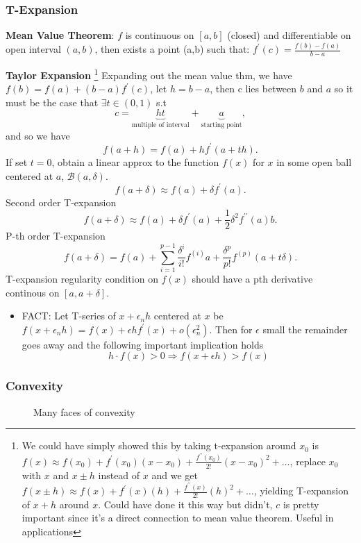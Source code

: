 \documentclass[11pt]{article}
\theoremstyle{quest}
\begin{document}
\subsubsection{T-Expansion}
\begin{flushleft}\textbf{Mean Value Theorem}: $f$ is continuous on $[a,b]$ (closed) and differentiable on open interval $(a,b)$, then exists a point (a,b) such that: $f^{'}(c) = \frac{f(b)-f(a)}{b-a}$\end{flushleft}
%
\textbf{Taylor Expansion}%
%
\footnote{We could have simply showed this by taking t-expansion around $x_0$ is $f(x)\approx f(x_0)+f^\prime(x_0)(x-x_0)+\frac{f^{\prime\prime}(x_0)}{2!}(x-x_0)^2+\dots $, replace $x_0$ with $x$ and $x\pm h$ instead of $x$ and we get $f(x\pm h)\approx f(x)+f^\prime(x)(h)+\frac{f^{\prime\prime}(x)}{2!}(h)^2+\dots $, yielding T-expansion of $x+h$  around $x$. Could have done it this way but didn't, $c$ is pretty important since it's a direct connection to mean value theorem. Useful in applications}
%
%
Expanding out the mean value thm, we have $f(b)=f(a)+(b-a)f^\prime(c)$, let $h=b-a$, then c lies between $b$ and $a$ so it must be the case that  $\exists t \in (0,1)$ s.t $$c=\underbrace{ht}_{\text{multiple of interval}}+\underbrace{a}_{\text{starting point}},$$and so we have \[f(a+h)=f(a)+h f^\prime(a+th).\] If set $t=0$, obtain a linear approx to the function $f(x)$ for $x$ in some open ball centered at $a$, $\mathcal{B}(a,\delta).$
\[f(a+\delta) \approx f(a)+\delta f^\prime(a).\] Second order T-expansion \[f(a+\delta) \approx f(a)+\delta f^\prime(a) + \frac{1}{2}\delta^2 f^{\prime\prime}(a)b.\] P-th order T-expansion \[f(a+\delta) = f(a) + \sum_{i=1}^{p-1}\frac{\delta^i}{i!}f^{(i)}a+\frac{\delta^p}{p!}f^{(p)}(a+t\delta). \] T-expansion regularity condition on $f(x)$ should have a pth derivative continous on $[a, a+\delta ]$. \\
\begin{itemize}
	\item FACT: Let T-series of $x+\epsilon_n h$ centered at $x$ be $f(x+\epsilon_n h) = f(x) +\epsilon h f^\prime(x)+o(\epsilon_n^2)$. Then for $\epsilon$ small the remainder goes away and the following important implication holds  $$h\cdot f(x) >0 \Rightarrow f(x+\epsilon h) >f(x)$$
\end{itemize}
%


\subsubsection{Convexity}
\begin{figure}[!h]
\centering \label{fig:convexity}
\caption{Many faces of convexity }
\end{figure}
\FloatBarrier
\newpage
%
\end{document}
